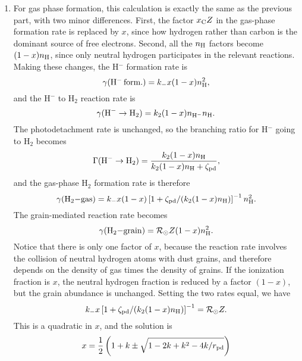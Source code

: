 \begin{enumerate}
\begin{enumerate}
\item For gas phase formation, this calculation is exactly the same as the previous part, with two minor differences. First, the factor $x_{\rm C} Z$ in the gas-phase formation rate is replaced by $x$, since how hydrogen rather than carbon is the dominant source of free electrons. Second, all the $n_{\rm H}$ factors become $(1-x) n_{\rm H}$, since only neutral hydrogen participates in the relevant reactions. Making these changes, the H$^-$ formation rate is
\begin{displaymath}
\gamma({\rm H}^{-}\,{\rm form.}) = k_{-} x (1-x) n_{\rm H}^2,
\end{displaymath}
and the H$^-$ to H$_2$ reaction rate is
\begin{displaymath}
\gamma({\rm H}^{-}\rightarrow{\rm H}_2) = k_2 (1-x) n_{{\rm H}^-} n_{\rm H}.
\end{displaymath}
The photodetachment rate is unchanged, so the branching ratio for H$^-$ going to H$_2$ becomes
\begin{displaymath}
\Gamma({\rm H}^{-}\rightarrow{\rm H}_2) = \frac{k_2 (1-x) n_{\rm H}}{k_2 (1-x) n_{\rm H}+\zeta_{\rm pd}},
\end{displaymath}
and the gas-phase H$_2$ formation rate is therefore
\begin{displaymath}
\gamma({\rm H}_2{\rm - gas}) = k_{-} x (1-x)  \left[1+ \zeta_{\rm pd}/(k_2 (1-x) n_{\rm H})\right]^{-1} n_{\rm H}^2. 
\end{displaymath}
The grain-mediated reaction rate becomes
\begin{displaymath}
\gamma({\rm H}_2{\rm - grain}) = \mathcal{R}_{\odot} Z (1-x) n_{\rm H}^2.
\end{displaymath}
Notice that there is only one factor of $x$, because the reaction rate involves the collision of neutral hydrogen atoms with dust grains, and therefore depends on the density of gas times the density of grains. If the ionization fraction is $x$, the neutral hydrogen fraction is reduced by a factor $(1-x)$, but the grain abundance is unchanged. Setting the two rates equal, we have
\begin{displaymath}
k_{-} x \left[1+ \zeta_{\rm pd}/(k_2 (1-x) n_{\rm H})\right]^{-1} = \mathcal{R}_{\odot} Z.
\end{displaymath}
This is a quadratic in $x$, and the solution is
\begin{displaymath}
x = \frac{1}{2}\left(1+k \pm \sqrt{1-2k + k^2 - 4 k/r_{\rm pd}}\right)
\end{displaymath}
\begin{marginfigure}

\end{marginfigure}
\end{enumerate}
\end{enumerate}
